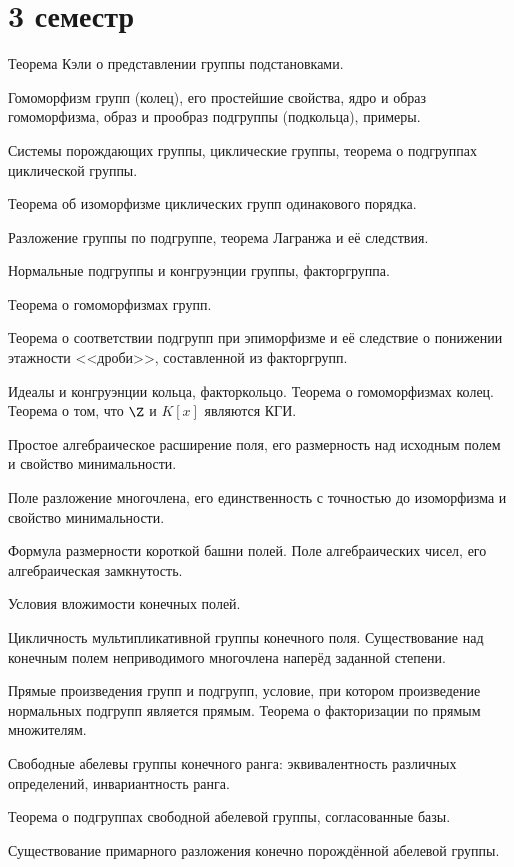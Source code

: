 \documentclass[a4paper]{article}
\begin{document}
\section*{3 семестр}

\begin{nums}{-3}
\item Теорема Кэли о представлении группы подстановками.
\item Гомоморфизм групп (колец), его простейшие свойства, ядро и образ
гомоморфизма, образ и прообраз подгруппы (подкольца), примеры.
\item Системы порождающих группы, циклические группы, теорема о
подгруппах циклической группы.
\item Теорема об изоморфизме циклических групп одинакового порядка.
\item Разложение группы по подгруппе, теорема Лагранжа и её следствия.
\item Нормальные подгруппы и конгруэнции группы, факторгруппа.
\item Теорема о гомоморфизмах групп.
\item Теорема о соответствии подгрупп при эпиморфизме и её следствие
о понижении этажности <<дроби>>, составленной из факторгрупп.
\item Идеалы и конгруэнции кольца, факторкольцо. Теорема о гомоморфизмах колец. Теорема
о том, что $\Z$ и $K[x]$ являются КГИ.
\item Простое алгебраическое расширение поля, его размерность над исходным полем и свойство
минимальности.
\item Поле разложение многочлена, его единственность с точностью до изоморфизма и свойство
минимальности.
\item Формула размерности короткой башни полей. Поле алгебраических чисел, его алгебраическая
замкнутость.
\item Условия вложимости конечных полей.
\item Цикличность мультипликативной группы конечного поля. Существование
над конечным полем неприводимого многочлена наперёд заданной
степени.
\item Прямые произведения групп и подгрупп, условие, при котором произведение нормальных
подгрупп является прямым. Теорема о факторизации по прямым множителям.
\item Свободные абелевы группы конечного ранга: эквивалентность
различных определений, инвариантность ранга.
\item Теорема о подгруппах свободной абелевой группы, согласованные базы.
\item Существование примарного разложения конечно порождённой абелевой группы.

\end{nums}
\end{document}
